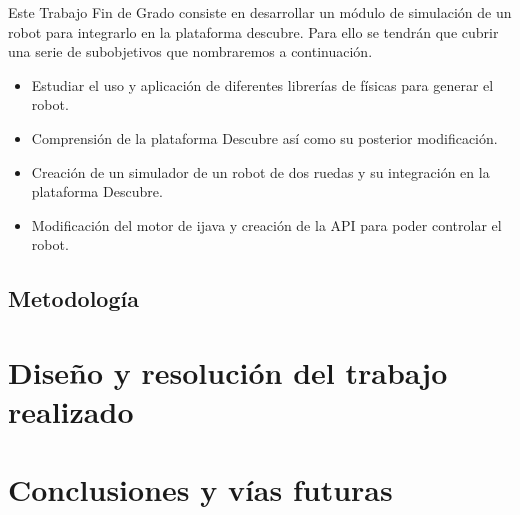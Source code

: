 Este Trabajo Fin de Grado consiste en desarrollar un módulo de simulación de un robot para integrarlo en la plataforma \Gls{descubre}. Para ello se tendrán que cubrir una serie de subobjetivos que nombraremos a continuación.
\begin{itemize}
\item Estudiar el uso y aplicación de diferentes librerías de físicas para generar el robot.
\item Comprensión de la plataforma Descubre así como su posterior modificación.
\item Creación de un simulador de un robot de dos ruedas y su integración en la plataforma Descubre.
\item Modificación del motor de \gls{ijava} y creación de la \acrshort{API} para poder controlar el robot.
\end{itemize}

\section{Metodología}
\label{sec:metodologia}

\chapter{Diseño y resolución del trabajo realizado}\label{diseno}




\chapter{Conclusiones y vías futuras}\label{conslusiones}

